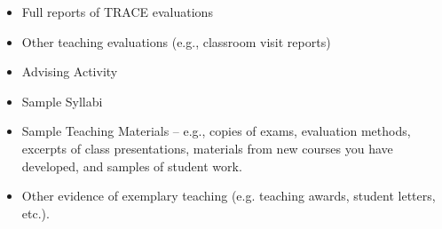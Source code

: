 \begin{itemize}
    \item Full reports of TRACE evaluations
    \item Other teaching evaluations (e.g., classroom visit reports)
    \item Advising Activity
    \item Sample Syllabi
    \item Sample Teaching Materials -- e.g., copies of exams, evaluation methods, excerpts of class presentations, materials from new courses you have developed, and samples of student work.
    \item Other evidence of exemplary teaching (e.g. teaching awards, student letters, etc.).
\end{itemize}


\label{syllabus-ds2000}

